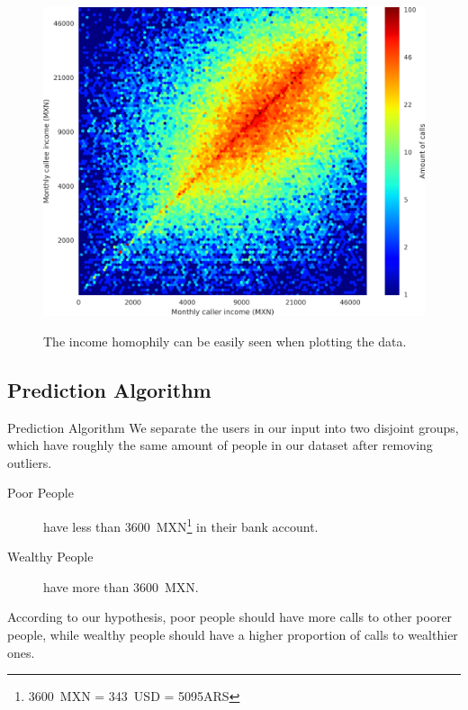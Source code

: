 \documentclass{beamer}
\begin{document}
\begin{frame}

\begin{figure}[h]
	\begin{center}
		{\includegraphics[height=0.8\textheight]
		{Homophily_income_origin_target_1.png}
		}\label{homophily_heatmap}
	\end{center}
	\caption{The income homophily can be easily seen when plotting the data.}
\end{figure}

\end{frame}

\subsection{Prediction Algorithm}
\begin{frame}{Prediction Algorithm}
	We separate the users in our input into two disjoint groups, which have roughly the same amount of people in our dataset after removing outliers.

	\begin{description}
		\item[Poor People] have less than \num{3600}~MXN\footnote{3600~MXN = 343~USD = \num{5095}ARS} in their bank account.
		\item[Wealthy People] have more than \num{3600}~MXN.\@
	\end{description}

	According to our hypothesis, poor people should have more calls to other poorer people, while wealthy people should have a higher proportion of calls to wealthier ones.
\end{frame}
\end{document}

